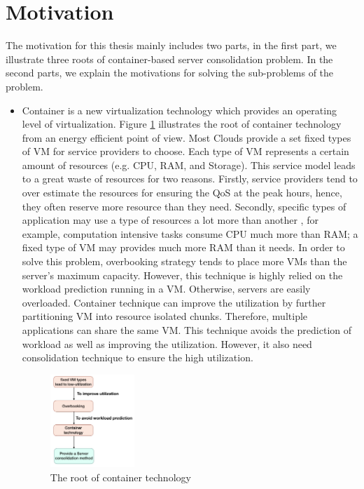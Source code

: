 
\section{Motivation}

The motivation for this thesis mainly includes two parts, in the first part, we illustrate three roots of container-based server consolidation problem. In the second parts, we explain the motivations for solving the sub-problems of the problem.
\begin{itemize}

\item Container is a new virtualization technology which provides an operating level of virtualization.
Figure \ref{fig:root} illustrates the root of container technology from an energy efficient point of view. Most Clouds provide a set fixed types of VM for service providers to choose. Each type of VM represents a certain amount of resources (e.g. CPU, RAM, and Storage). This service model leads to a great waste of resources for two reasons. Firstly, service providers tend to over estimate the resources for ensuring the QoS at the peak hours, hence, they often reserve more resource than they need\cite{Chaisiri:2012wg}. 
Secondly, specific types of application may use a type of resources a lot more than another \cite{Tomas:2013iv}, for example, computation intensive tasks consume CPU much more than RAM; a fixed type of VM may provides much more RAM than it needs. In order to solve this problem, overbooking strategy tends to place more VMs than the server's maximum capacity. However, this technique is highly relied on the workload prediction running in a VM. Otherwise, servers are easily overloaded. Container technique can improve the utilization by further partitioning VM into resource isolated chunks. Therefore, multiple applications can share the same VM. This technique avoids the prediction of workload as well as improving the utilization. However, it also need consolidation technique to ensure the high utilization.

\begin{figure}
	\centering
	\includegraphics[width=0.3\textwidth]{pics/problem_flow.jpeg}
	\caption{The root of container technology}
	\label{fig:root}
\end{figure}


\end{itemize}

